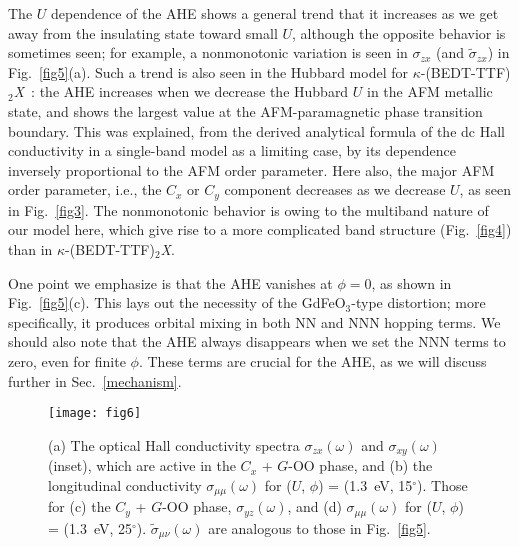 \documentclass[aps,twocolumn,prb,preprintnumbers,amsmath,amssymb]{revtex4-2}
\begin{document}
The $U$ dependence of the AHE shows a general trend that 
 it increases as we get away from the insulating state toward small $U$, 
 although the opposite behavior is sometimes seen; 
 for example, a nonmonotonic variation is seen in $\sigma_{zx}$ (and $\tilde{\sigma}_{zx}$) in Fig.~\ref{fig5}(a). 
Such a trend is also seen in the Hubbard model for $\kappa$-(BEDT-TTF)$_2${\it X}~\cite{naka}: 
 the AHE increases when we decrease the Hubbard $U$ in the AFM metallic state, 
 and shows the largest value at the AFM-paramagnetic phase transition boundary. 
This was explained, from the derived analytical formula of the dc Hall conductivity in a single-band model as a limiting case, 
 by its dependence inversely proportional to the AFM order parameter. 
Here also, the major AFM order parameter, i.e., the $C_x$ or $C_y$ component 
 decreases as we decrease $U$, as seen in Fig.~\ref{fig3}. 
The nonmonotonic behavior is owing to the multiband nature of our model here, 
 which give rise to a more complicated band structure (Fig.~\ref{fig4}) than in $\kappa$-(BEDT-TTF)$_2${\it X}. 

One point we emphasize is that the AHE vanishes at $\phi=0$, as shown in Fig.~\ref{fig5}(c). 
This lays out the necessity of the GdFeO$_3$-type distortion; more specifically, it produces orbital mixing in both NN and NNN hopping terms. 
We should also note that the AHE always disappears when we set the NNN terms to zero, even for finite $\phi$. 
These terms are crucial for the AHE, as we will discuss further in Sec.~\ref{mechanism}. 

\begin{figure}%
\begin{center}
\texttt{[image: fig6]}
\end{center}
\caption{
(a) The optical Hall conductivity spectra $\sigma_{zx}(\omega)$ and $\sigma_{xy}(\omega)$ (inset), 
 which are active in the $C_x$ + $G$-OO phase, 
 and (b) the longitudinal conductivity $\sigma_{\mu\mu}(\omega)$ for ($U$, $\phi$) =  (1.3~eV, 15$^\circ$). 
Those for (c) the $C_y$ + $G$-OO phase, $\sigma_{yz}(\omega)$, and (d) $\sigma_{\mu\mu}(\omega)$ for ($U$, $\phi$) =  (1.3~eV, 25$^\circ$). 
$\tilde{\sigma}_{\mu\nu}(\omega)$ are analogous to those in Fig.~\ref{fig5}.
}
\label{fig6}
\end{figure}
\end{document}
